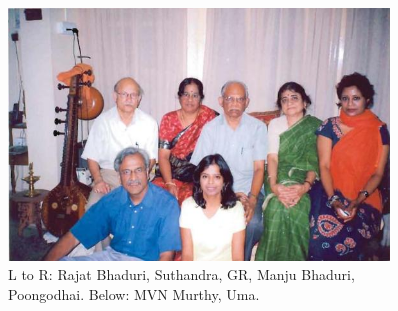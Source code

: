 \begin{figure}[h]
\centering
\includegraphics[width=0.9\textwidth]{images/Rajaji-family.jpg}
\caption{\small{L to R: Rajat Bhaduri, Suthandra, GR, Manju Bhaduri, Poongodhai.
Below: MVN Murthy, Uma.}}
\end{figure}

\medskip


